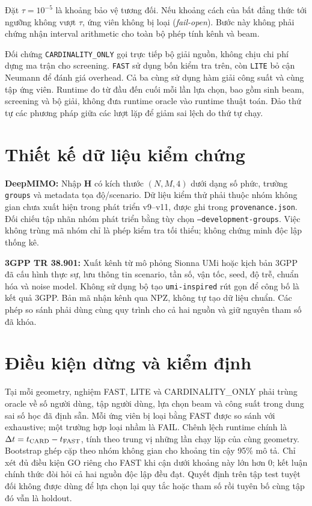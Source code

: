 \documentclass[11pt,onecolumn]{IEEEtran}
\begin{document}
Đặt $\tau=10^{-5}$ là khoảng bảo vệ tương đối. Nếu khoảng cách của bất đẳng thức tới ngưỡng không vượt $\tau$, ứng viên không bị loại (\emph{fail-open}). Bước này không phải chứng nhận interval arithmetic cho toàn bộ phép tính kênh và beam.

Đối chứng \texttt{CARDINALITY\_ONLY} gọi trực tiếp bộ giải nguồn, không chịu chi phí dựng ma trận cho screening. \texttt{FAST} sử dụng bốn kiểm tra trên, còn \texttt{LITE} bỏ cận Neumann để đánh giá overhead. Cả ba cùng sử dụng hàm giải công suất và cùng tập ứng viên. Runtime đo từ đầu đến cuối mỗi lần lựa chọn, bao gồm sinh beam, screening và bộ giải, không đưa runtime oracle vào runtime thuật toán. Đảo thứ tự các phương pháp giữa các lượt lặp để giảm sai lệch do thứ tự chạy.

\section{Thiết kế dữ liệu kiểm chứng}
\textbf{DeepMIMO:} Nhập $\widehat{\mathbf H}$ có kích thước $(N,M,4)$ dưới dạng số phức, trường \texttt{groups} và metadata tọa độ/scenario. Dữ liệu kiểm thử phải thuộc nhóm không gian chưa xuất hiện trong phát triển v9--v11, được ghi trong \texttt{provenance.json}. Đối chiếu tập nhãn nhóm phát triển bằng tùy chọn \texttt{--development-groups}. Việc không trùng mã nhóm chỉ là phép kiểm tra tối thiểu; không chứng minh độc lập thống kê.

\textbf{3GPP TR 38.901:} Xuất kênh từ mô phỏng Sionna UMi hoặc kịch bản 3GPP đã cấu hình thực sự, lưu thông tin scenario, tần số, vận tốc, seed, độ trễ, chuẩn hóa và noise model. Không sử dụng bộ tạo \texttt{umi-inspired} rút gọn để công bố là kết quả 3GPP. Bản mã nhận kênh qua NPZ, không tự tạo dữ liệu chuẩn. Các phép so sánh phải dùng cùng quy trình cho cả hai nguồn và giữ nguyên tham số đã khóa.

\section{Điều kiện dừng và kiểm định}
Tại mỗi geometry, nghiệm FAST, LITE và CARDINALITY\_ONLY phải trùng oracle về số người dùng, tập người dùng, lựa chọn beam và công suất trong dung sai số học đã định sẵn. Mỗi ứng viên bị loại bằng FAST được so sánh với exhaustive; một trường hợp loại nhầm là FAIL. Chênh lệch runtime chính là $\Delta t=t_{\rm CARD}-t_{\rm FAST}$, tính theo trung vị những lần chạy lặp của cùng geometry. Bootstrap ghép cặp theo nhóm không gian cho khoảng tin cậy 95\% mô tả. Chỉ xét đủ điều kiện GO riêng cho FAST khi cận dưới khoảng này lớn hơn 0; kết luận chính thức đòi hỏi cả hai nguồn độc lập đều đạt. Quyết định trên tập test tuyệt đối không được dùng để lựa chọn lại quy tắc hoặc tham số rồi tuyên bố cùng tập đó vẫn là holdout.
\end{document}
